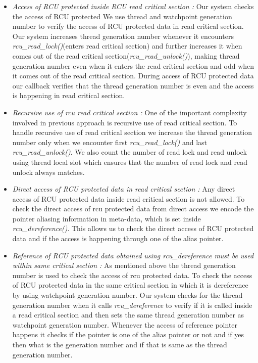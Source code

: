 \begin {itemize} 
	\item \emph{Access of RCU protected inside RCU read critical section :} Our system checks the access of RCU protected We use thread and watchpoint generation number to verify the access of RCU protected data in read critical section. Our system increases thread generation number whenever it encounters \emph{rcu\_read\_lock()}(enters read critical section) and further increases it when comes out of the read critical section(\emph{rcu\_read\_unlock()}), making thread generation number even when it enters the read critical section and odd when it comes out of the read critical section. During access of RCU protected data our callback verifies that the thread generation number is even and the access is happening in read critical section.

	\item \emph{Recursive use of rcu read critical section :} One of the important complexity involved in previous approach is recursive use of read critical section. To handle recursive use of read critical section we increase the thread generation number only when we encounter first \emph{rcu\_read\_lock()} and last \emph{rcu\_read\_unlock()}. We also count the number of read lock and read unlock using thread local slot which ensures that the number of read lock and read unlock always matches.

	\item \emph{ Direct access of RCU protected data in read critical section :} Any direct access of RCU protected data inside read critical section is not allowed. To check the direct access of rcu protected data from direct access we encode the pointer aliasing information in meta-data, which is set inside \emph{rcu\_dereference()}. This allows us to check the direct access of RCU protected data and if the access is happening through one of the alias pointer.

	\item \emph{ Reference of RCU protected data obtained using \emph{rcu\_dereference} must be used within same critical section :} As mentioned above the thread generation number is used to check the access of rcu protected data. To check the access of RCU protected data in the same critical section in which it is dereference by using watchpoint generation number. Our system checks for the thread generation number when it calls \emph{rcu\_dereference} to verify if it is called inside a read critical section and then sets the same thread generation number as watchpoint generation number. Whenever the access of reference pointer happens it checks if the pointer is one of the alias pointer or not and if yes then what is the generation number and if that is same as the thread generation number. 


\end{itemize}
